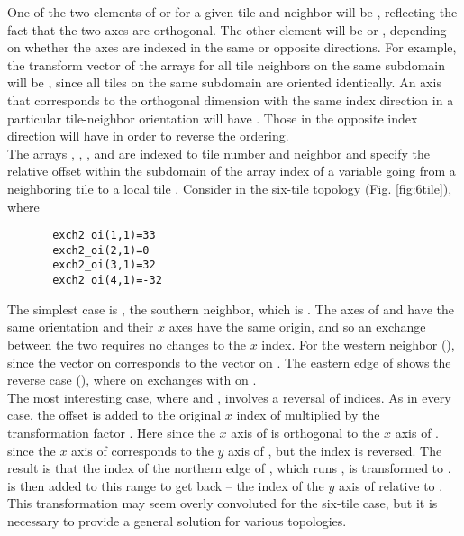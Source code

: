One of the two elements of  or  for a
given tile  and neighbor  will be , reflecting
the fact that the two axes are orthogonal.  The other element will be
 or , depending on whether the axes are indexed in
the same or opposite directions.  For example, the transform vector of
the arrays for all tile neighbors on the same subdomain will be
, since all tiles on the same subdomain are oriented
identically.  An axis that corresponds to the orthogonal dimension
with the same index direction in a particular tile-neighbor
orientation will have .  Those in the opposite index
direction will have  in order to reverse the ordering. \\

The arrays ,
, , and
 are indexed to tile number and
neighbor and specify the relative offset within the subdomain of the
array index of a variable going from a neighboring tile  to a
local tile .  Consider  in the six-tile topology
(Fig. \ref{fig:6tile}), where

\begin{verbatim}
       exch2_oi(1,1)=33
       exch2_oi(2,1)=0
       exch2_oi(3,1)=32
       exch2_oi(4,1)=-32
\end{verbatim}

The simplest case is , the southern neighbor,
which is .  The axes of  and  have the
same orientation and their $x$ axes have the same origin, and so an
exchange between the two requires no changes to the $x$ index.  For
the western neighbor (),  since the
 vector on  corresponds to the  vector on
.  The eastern edge of  shows the reverse case
(), where  on  exchanges
with  on . \\

 The most interesting case, where  and
, involves a reversal of indices.  As in every case, the
offset  is added to the original $x$ index of 
multiplied by the transformation factor .  Here
 since the $x$ axis of  is orthogonal
to the $x$ axis of .   since the
$x$ axis of  corresponds to the $y$ axis of , but the
index is reversed.  The result is that the index of the northern edge
of , which runs , is transformed to
.  is then added to this range to
get back  -- the index of the $y$ axis of 
relative to .  This transformation may seem overly convoluted
for the six-tile case, but it is necessary to provide a general
solution for various topologies. \\



